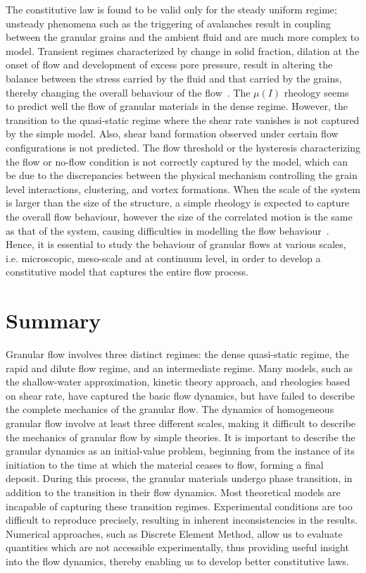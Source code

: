The constitutive law is found to be valid only for the steady uniform regime; 
unsteady phenomena such as the triggering of avalanches result in coupling 
between the granular grains and the ambient fluid and are much more complex 
to model. Transient regimes characterized by change in solid fraction, dilation 
at the onset of flow and development of excess pore pressure, result in 
altering the balance between the stress carried by the fluid and that carried 
by the grains, thereby changing the overall behaviour of the 
flow~\citep{Denlinger2001}. The $\mu (I)$ rheology seems to predict well the 
flow of granular materials in the dense regime. However, the transition to the 
quasi-static regime where the shear rate vanishes is not captured by the simple 
model. Also, shear band formation observed under certain flow configurations is 
not predicted. The flow threshold or the hysteresis characterizing the flow or 
no-flow condition is not correctly captured by the model, which can be due to 
the discrepancies between the physical mechanism controlling the grain level 
interactions, clustering, and vortex formations. When the scale of the system 
is larger than the size of the structure, a simple rheology is expected to 
capture the overall flow behaviour, however the size of the correlated motion 
is the same as that of the system, causing difficulties in modelling the flow 
behaviour~\citep{Pouliquen2005}. Hence, it is essential to study the behaviour 
of granular flows at various scales, i.e. microscopic, meso-scale and at 
continuum level, in order to develop a constitutive model that captures the 
entire flow process.

\section{Summary}
Granular flow involves three distinct regimes: the dense quasi-static regime, 
the rapid and dilute flow regime, and an intermediate regime. Many models, such 
as the shallow-water approximation, kinetic theory approach, and rheologies 
based on shear rate, have captured the basic flow dynamics, but have failed to 
describe the complete mechanics of the granular flow. The dynamics of 
homogeneous granular flow involve at least three different scales, making it 
difficult to describe the mechanics of granular flow by simple theories. It is 
important to describe the granular dynamics as an initial-value problem, 
beginning from the instance of its initiation to the time at which the material 
ceases to flow, forming a final deposit. During this process, the granular 
materials undergo phase transition, in addition to the transition in their flow 
dynamics. Most theoretical models are incapable of capturing these transition 
regimes. Experimental conditions are too difficult to reproduce precisely, 
resulting in inherent inconsistencies in the results. Numerical 
approaches, such as Discrete Element Method, allow us to evaluate quantities 
which are not accessible experimentally, thus providing useful insight into the 
flow dynamics, thereby enabling us to develop better constitutive laws. 
